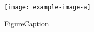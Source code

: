 \begin{figure}[!h]
    \centering
    \texttt{[image: example-image-a]}
    \caption{FigureCaption}
\end{figure}